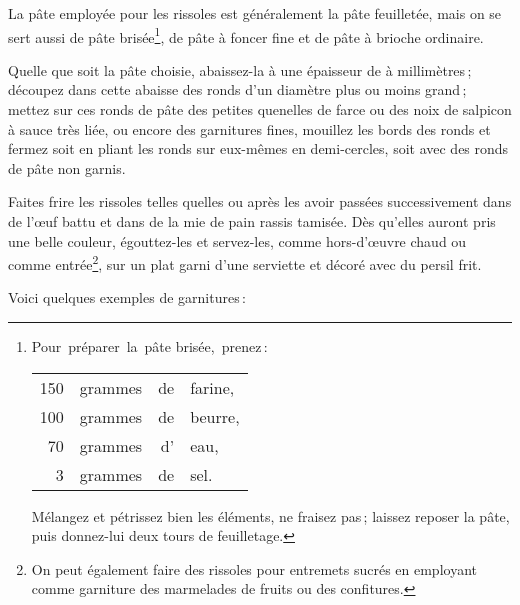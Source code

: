 La pâte employée pour les rissoles est généralement la pâte feuilletée, mais on
se sert aussi de pâte brisée\footnote{Pour préparer la pâte brisée, prenez :
        \protect\endgraf
        \begin{tabular}{rrrl}
        \hspace{4em} 150 & grammes & de & farine,                                                         \\
        \hspace{4em} 100 & grammes & de & beurre,                                                         \\
        \hspace{4em}  70 & grammes & d' & eau,                                                            \\
        \hspace{4em}   3 & grammes & de & sel.                                                            \\
        \end{tabular}
        \protect\endgraf

Mélangez et pétrissez bien les éléments, ne fraisez pas ; laissez reposer la
pâte, puis donnez-lui deux tours de feuilletage.}, de pâte à foncer fine et de
pâte à brioche ordinaire.

Quelle que soit la pâte choisie, abaissez-la à une épaisseur de {\mmm}
à {\mmm} millimètres ; découpez dans cette abaisse des ronds d'un diamètre
plus ou moins grand ; mettez sur ces ronds de pâte des petites quenelles de
farce ou des noix de salpicon à sauce très liée, ou encore des garnitures
fines, mouillez les bords des ronds et fermez soit en pliant les ronds sur
eux-mêmes en demi-cercles, soit avec des ronds de pâte non garnis.

Faites frire les rissoles telles quelles ou après les avoir passées
successivement dans de l'œuf battu et dans de la mie de pain rassis tamisée.
Dès qu'elles auront pris une belle couleur, égouttez-les et servez-les, comme
hors-d'œuvre chaud ou comme entrée\footnote{ On peut également faire des
rissoles pour entremets sucrés en employant comme garniture des marmelades de
fruits ou des confitures.}, sur un plat garni d'une serviette et décoré avec du
persil frit.

\medskip

Voici quelques exemples de garnitures :

\medskip

